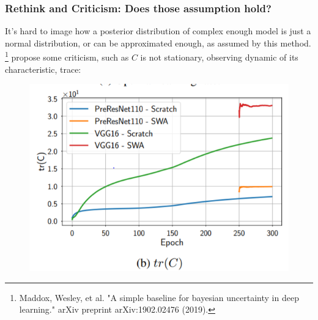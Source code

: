 \documentclass{beamer}
\begin{document}
\begin{frame}
    \frametitle{Rethink and Criticism: Does those assumption hold?}

    It's hard to image how a posterior distribution of complex enough model is just a normal distribution,
    or can be approximated enough, as assumed by this method. 
    \footnote{Maddox, Wesley, et al. "A simple baseline for bayesian uncertainty in deep learning." arXiv preprint arXiv:1902.02476 (2019).} 
    propose some criticism, such as $C$ is not stationary, observing dynamic of its characteristic, trace: 

    \begin{figure}[htb]
        \centering
        \includegraphics[width=0.5\linewidth]{cri.png}
    \end{figure} 


\end{frame}
\end{document}
